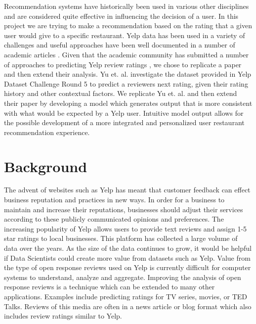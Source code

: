 \documentclass[12pt]{article}
\begin{document}
Recommendation systems have historically been used in various other disciplines and
are considered quite effective in influencing the decision of a user. In this project
we are trying to make a recommendation based on the rating that a given user would give
to a specific restaurant. Yelp data \cite{YelpData60:online, YelpData59:online} has been
used in a variety of challenges and useful approaches have been well documented in a number of
academic articles \cite{yu2015restaurants, huang2014improving, fan2014predicting,asghar2016yelp}.
Given that the academic community has submitted a number of approaches to predicting
Yelp review ratings \cite{asghar2016yelp, potamias2012warm, fan2014predicting, yu2015restaurants},
we chose to replicate a paper and then extend their analysis. Yu et. al. \cite{yu2015restaurants}
investigate the dataset provided in Yelp Dataset Challenge Round 5 to predict a reviewers
next rating, given their rating history and other contextual factors. We replicate
Yu et. al. \cite{yu2015restaurants} and then extend their paper by developing a model which
generates output that is more consistent with what would be expected by a Yelp user. Intuitive
model output allows for the possible development of a more integrated and personalized user
restaurant recommendation experience.


\section{Background}

The advent of websites such as Yelp has meant that customer feedback can effect business
reputation and practices in new ways. In order for a business to maintain and increase their
reputations, businesses should adjust their services according to these publicly communicated
opinions and preferences. The increasing popularity of Yelp allows users to provide
text reviews and assign 1-5 star ratings to local businesses. This platform has collected a large
volume of data over the years. As the size of the data continues to grow, it would be helpful if
Data Scientists could create more value from datasets such as Yelp. Value from the type of
open response reviews used on Yelp is currently difficult for computer systems to understand,
analyze and aggregate. Improving the analysis of open response reviews is a technique which can
be extended to many other applications. Examples include predicting ratings for TV series, movies,
or TED Talks. Reviews of this media are often in a news article or blog format which also includes
review ratings similar to Yelp.
\end{document}
